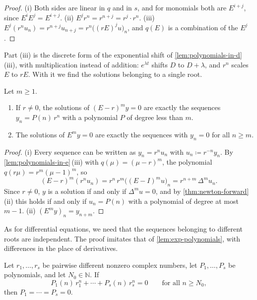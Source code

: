 \begin{proof}
(i) Both sides are linear in $q$ and in $s$, and for monomials both are $E^{i+j}$, since $E^iE^j=E^{i+j}$. (ii) $E^jr^n=r^{n+j}=r^j\cdot r^n$. (iii) $E^j(r^nu_n)=r^{n+j}u_{n+j}=r^n\bigl((rE)^ju\bigr)_n$, and $q(E)$ is a combination of the $E^j$.
\end{proof}

Part (iii) is the discrete form of the exponential shift of \cref{lem:polynomials-in-d}\,(iii), with multiplication instead of addition: $e^{\lambda t}$ shifts $D$ to $D+\lambda$, and $r^n$ scales $E$ to $rE$. With it we find the solutions belonging to a single root.

\begin{proposition}
\label{prop:kernel-power-e}
Let $m\ge1$.
\begin{enumerate}
\item If $r\ne0$, the solutions of $(E-r)^my=0$ are exactly the sequences $y_n=P(n)\,r^n$ with a polynomial $P$ of degree less than $m$.
\item The solutions of $E^my=0$ are exactly the sequences with $y_n=0$ for all $n\ge m$.
\end{enumerate}
\end{proposition}

\begin{proof}
(i) Every sequence can be written as $y_n=r^nu_n$ with $u_n\coloneqq r^{-n}y_n$. By \cref{lem:polynomials-in-e}\,(iii) with $q(\mu)=(\mu-r)^m$, the polynomial $q(r\mu)=r^m(\mu-1)^m$, so
\[
(E-r)^m(r^nu_n)=r^n\,r^m\bigl((E-I)^mu\bigr)_n=r^{n+m}\,\Delta^mu_n .
\]
Since $r\ne0$, $y$ is a solution if and only if $\Delta^mu=0$, and by \cref{thm:newton-forward}\,(ii) this holds if and only if $u_n=P(n)$ with a polynomial of degree at most $m-1$. (ii) $(E^my)_n=y_{n+m}$.
\end{proof}

As for differential equations, we need that the sequences belonging to different roots are independent. The proof imitates that of \cref{lem:exp-polynomials}, with differences in the place of derivatives.

\begin{lemma}
\label{lem:exp-poly-sequences}
Let $r_1,\ldots,r_s$ be pairwise different nonzero complex numbers, let $P_1,\ldots,P_s$ be polynomials, and let $N_0\in\mathbb N$. If
\[
P_1(n)\,r_1^n+\cdots+P_s(n)\,r_s^n=0\qquad\text{for all }n\ge N_0 ,
\]
then $P_1=\cdots=P_s=0$.
\end{lemma}

